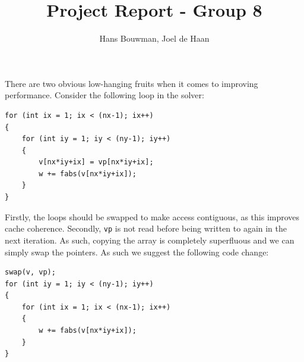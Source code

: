 \documentclass{article}
\title{Project Report - Group 8}
\author{Hans Bouwman, Joel de Haan}
\begin{document}
\maketitle


\tableofcontents

\newpage




There are two obvious low-hanging fruits when it comes to improving performance. Consider the following loop in the solver:

\begin{lstlisting}
for (int ix = 1; ix < (nx-1); ix++)
{
    for (int iy = 1; iy < (ny-1); iy++)
    {
        v[nx*iy+ix] = vp[nx*iy+ix];
        w += fabs(v[nx*iy+ix]);
    }
}
\end{lstlisting}

Firstly, the loops should be swapped to make access contiguous, as this improves cache coherence. Secondly, \texttt{vp} is not read before being written to again in the next iteration.
As such, copying the array is completely superfluous and we can simply swap the pointers. As such we suggest the following code change:

\begin{lstlisting}
swap(v, vp);
for (int iy = 1; iy < (ny-1); iy++)
{
    for (int ix = 1; ix < (nx-1); ix++)
    {
        w += fabs(v[nx*iy+ix]);
    }
}
\end{lstlisting}
\end{document}
